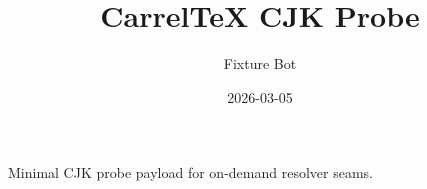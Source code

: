 \documentclass{article}
\title{CarrelTeX CJK Probe}
\author{Fixture Bot}
\date{2026-03-05}
\begin{document}
\maketitle

Minimal CJK probe payload for on-demand resolver seams.
\end{document}
